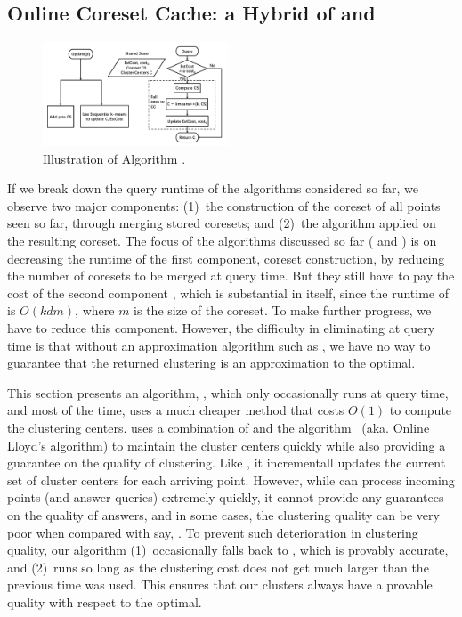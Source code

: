 \newcommand{\fallbackcost}{\texttt{$\phi_{prev}$}\xspace}
\newcommand{\estcost}{\texttt{$\phi_{now}$}\xspace}

\subsection{Online Coreset Cache: a Hybrid of \cc and \seqkm}
\label{sec:hybrid}

\begin{figure}[t]
  	\includegraphics[width=0.49\textwidth]{figs/algo-onlinecc.pdf}
  	\caption{Illustration of Algorithm \hybrid.}
\label{fig:algo-onlinecc}
\end{figure}

If we break down the query runtime of the algorithms considered so far, we
observe two major components: (1)~the construction of the coreset of all points
seen so far, through merging stored coresets; and (2)~the \kmpp algorithm
applied on the resulting coreset. The focus of the algorithms discussed so far (
\cc and \rcc) is on decreasing the runtime of the first component, coreset
construction, by reducing the number of coresets to be merged at query time. But
they still have to pay the cost of the second component \kmpp, which is
substantial in itself, since the runtime of \kmpp is $O(kdm)$, where $m$ is the
size of the coreset. To make further progress, we have to reduce this
component. However, the difficulty in eliminating \kmpp at query time is that
without an approximation algorithm such as \kmpp, we have no way to guarantee
that the returned clustering is an approximation to the optimal.


This section presents an algorithm, \hybrid, which only occasionally runs \kmpp
at query time, and most of the time, uses a much cheaper method that costs
$O(1)$ to compute the clustering centers. \hybrid uses a combination of \cc and
the \seqkm algorithm~\cite{MacQueen67} (aka. Online Lloyd's algorithm) to
maintain the cluster centers quickly while also providing a guarantee on the
quality of clustering. Like \seqkm, it incrementall updates the current set of
cluster centers for each arriving point. However, while \seqkm can process
incoming points (and answer queries) extremely quickly, it cannot provide any
guarantees on the quality of answers, and in some cases, the clustering quality
can be very poor when compared with say, \kmpp. To prevent such deterioration in
clustering quality, our algorithm (1)~occasionally falls back to \cc, which is
provably accurate, and (2)~runs \seqkm so long as the clustering cost does not
get much larger than the previous time \cc was used. This ensures that our
clusters always have a provable quality with respect to the optimal.

